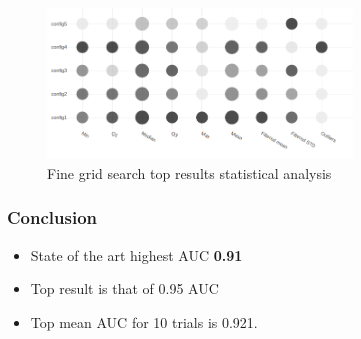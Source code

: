\begin{figure}[h]
\centering
\includegraphics[height= 4cm]{images/densenet/top5_analysis_bubble}
\caption{Fine grid search top results statistical analysis}
\label{fig:top5_analysis_bubble}
\end{figure}


\subsubsection{Conclusion}
\begin{itemize}
 \item State of the art highest AUC \textbf{0.91}
 \item Top result is that of 0.95 AUC
 \item Top mean AUC for 10 trials is 0.921.
\end{itemize}
